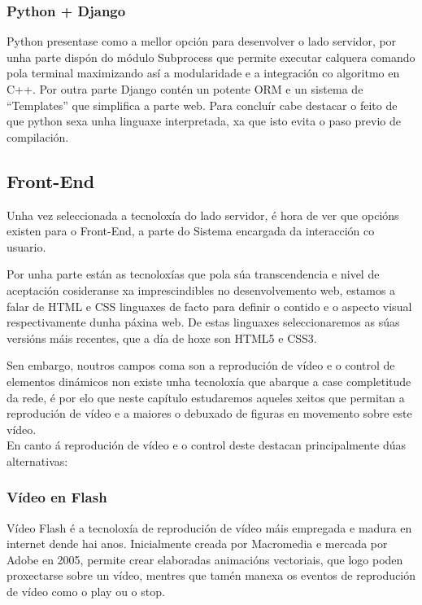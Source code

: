         \subsubsection{Python + Django}
        Python presentase como a mellor opción para desenvolver o lado servidor, por unha parte
        dispón do módulo Subprocess\cite{subprocess-module-url} que permite executar calquera
        comando pola terminal maximizando así a modularidade e a integración co algoritmo en C++.
        Por outra parte Django\cite{django-web-page-url} contén un potente ORM e un sistema de 
        ``Templates'' que simplifica a parte web. Para concluír cabe destacar o feito de que 
        python sexa unha linguaxe interpretada, xa que isto evita o paso previo de compilación.
        
        
    \subsection{Front-End}
        Unha vez seleccionada a tecnoloxía do lado servidor, é hora de ver que opcións existen para
        o Front-End, a parte do Sistema encargada da interacción co usuario.
        
        Por unha parte están as tecnoloxías que pola súa transcendencia e nivel de aceptación
        cosideranse xa imprescindibles no desenvolvemento web, estamos a falar de HTML e CSS linguaxes
        de facto para definir o contido e o aspecto visual respectivamente dunha páxina web.
        De estas linguaxes seleccionaremos as súas versións máis recentes, que a día de hoxe son HTML5 e
        CSS3.
        
        Sen embargo, noutros campos coma son a reprodución de vídeo e o control de elementos dinámicos
        non existe unha tecnoloxía que abarque a case completitude da rede, é por elo que neste capítulo
        estudaremos aqueles xeitos que permitan a reprodución de vídeo e a maiores o debuxado de 
        figuras en movemento sobre este vídeo.\\
        
        En canto á reprodución de vídeo e o control deste destacan principalmente dúas alternativas:
        
        \subsubsection{Vídeo en Flash}
            Vídeo Flash é a tecnoloxía de reprodución de vídeo máis empregada e madura en
            internet dende hai anos. Inicialmente creada por Macromedia e mercada por Adobe 
            en 2005, permite crear elaboradas animacións vectoriais, que logo poden proxectarse
            sobre un vídeo, mentres que tamén manexa os eventos de reprodución de vídeo como o 
            play ou o stop.
            
